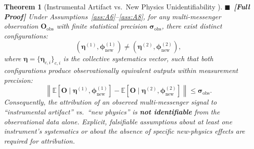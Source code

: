 \documentclass[11pt,a4paper]{article}
\newtheorem{theorem}{Theorem}[section]
\theoremstyle{definition}
\newcommand{\rigorFull}[0]{$\blacksquare$~\textbf{[Full Proof]}}
\newcommand{\E}{\mathbb{E}}
\newcommand{\norm}[1]{\left\lVert#1\right\rVert}
\begin{document}
\begin{theorem}[Instrumental Artifact vs.\ New Physics Unidentifiability ]\label{thm:unidentifiability}
\rigorFull
Under Assumptions~\ref{ass:A6}--\ref{ass:A8}, for any multi-messenger observation $\mathbf{O}_{\mathrm{obs}}$ with finite statistical precision $\boldsymbol{\sigma}_{\mathrm{obs}}$, there exist distinct configurations:
\begin{equation}
(\boldsymbol{\eta}^{(1)}, \boldsymbol{\phi}_{\mathrm{new}}^{(1)}) \neq (\boldsymbol{\eta}^{(2)}, \boldsymbol{\phi}_{\mathrm{new}}^{(2)}),
\end{equation}
where $\boldsymbol{\eta} = \{\boldsymbol{\eta}_{c,i}\}_{c,i}$ is the collective systematics vector, such that both configurations produce observationally equivalent outputs within measurement precision:
\begin{equation}\label{eq:obs_equiv_astro}
\norm{\E[\mathbf{O} \mid \boldsymbol{\eta}^{(1)}, \boldsymbol{\phi}_{\mathrm{new}}^{(1)}] - \E[\mathbf{O} \mid \boldsymbol{\eta}^{(2)}, \boldsymbol{\phi}_{\mathrm{new}}^{(2)}]} \leq \boldsymbol{\sigma}_{\mathrm{obs}}.
\end{equation}
Consequently, the attribution of an observed multi-messenger signal to ``instrumental artifact'' vs.\ ``new physics'' is \textbf{not identifiable} from the observational data alone. Explicit, falsifiable assumptions about at least one instrument's systematics or about the absence of specific new-physics effects are required for attribution.
\end{theorem}
\end{document}
